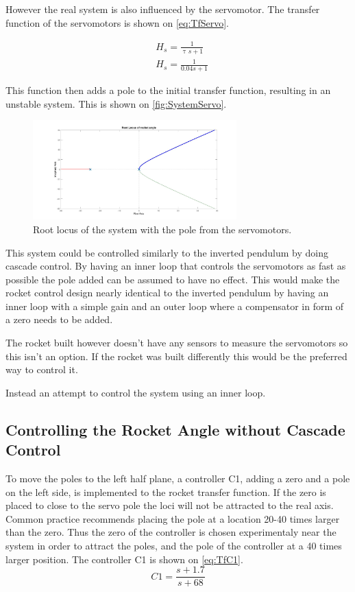 However the real system is also influenced by the servomotor. The transfer function of the servomotors is shown on \autoref{eq:TfServo}. 

\begin{subequations}
	\begin{flalign}
& H_s = \frac{1}{\uptau s+ 1}	\\
& H_s = \frac{1}{0.04s + 1}
\label{eq:TfServo}
	\end{flalign}
\end{subequations}
\startexplain
{}
\stopexplain

This function then adds a pole to the initial transfer function, resulting in an unstable system. This is shown on \autoref{fig:SystemServo}.
\begin{figure}[htbp]
\centering
\includegraphics[width=0.7\textwidth]{figures/Rocket/design/tf_with_servo_vf}
\caption{Root locus of the system with the pole from the servomotors.}
\label{fig:SystemServo}
\end{figure}

This system could be controlled similarly to the inverted pendulum by doing cascade control. By having an inner loop that controls the servomotors as fast as possible the pole added can be assumed to have no effect. This would make the rocket control design nearly identical to the inverted pendulum by having an inner loop with a simple gain and an outer loop where a compensator in form of a zero needs to be added. 

The rocket built however doesn't have any sensors to measure the servomotors so this isn't an option. If the rocket was built differently this would be the preferred way to control it.

Instead an attempt to control the system using an inner loop.

\subsection{Controlling the Rocket Angle without Cascade Control}
To move the poles to the left half plane, a controller C1, adding a zero and a pole on the left side, is implemented to the rocket transfer function. If the zero is placed to close to the servo pole the loci will not be attracted to the real axis. Common practice recommends placing the pole at a location 20-40 times larger than the zero. Thus the zero of the controller is chosen experimentaly near the system in order to attract the poles, and the pole of the controller at a 40 times larger position. The controller C1 is shown on \autoref{eq:TfC1}.
\begin{equation}
C1 = \frac{s + 1.7}{s + 68}	\label{eq:TfC1}
\end{equation}

